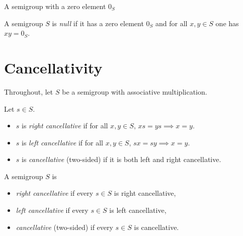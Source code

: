 \begin{definition}
\label{def:semigroup-with-zero}
A semigroup with a zero element \(0_S\)
\end{definition}

\begin{definition}
\label{def:null-semigroup}
\leanok
A semigroup \(S\) is \emph{null} if it has a zero element \(0_S\) and for all \(x,y\in S\) one has \(x y = 0_S\).
\end{definition}


\section{Cancellativity}

Throughout, let \(S\) be a semigroup with associative multiplication.

\begin{definition}
\label{def:cancellative-element}
\leanok
Let \(s\in S\).
\begin{itemize}
  \item \(s\) is \emph{right cancellative} if for all \(x,y\in S\), \(x s = y s \implies x = y\).
  \item \(s\) is \emph{left cancellative} if for all \(x,y\in S\), \(s x = s y \implies x = y\).
  \item \(s\) is \emph{cancellative} (two-sided) if it is both left and right cancellative.
\end{itemize}
\end{definition}

\begin{definition}
\label{def:cancellative-semigroup}
A semigroup \(S\) is
\begin{itemize}
  \item \emph{right cancellative} if every \(s\in S\) is right cancellative,
  \item \emph{left cancellative} if every \(s\in S\) is left cancellative,
  \item \emph{cancellative} (two-sided) if every \(s\in S\) is cancellative.
\end{itemize}
\end{definition}


